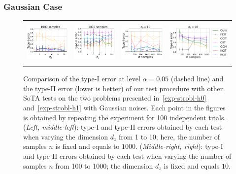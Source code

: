 \subsubsection{Gaussian Case}
\vspace{-0.4cm}

\begin{figure}[h]
\begin{tabular}{cccc} 
\includegraphics[height=2.2cm]{sections/appendix/independence_testing_kernel/figures_strobl_gaussian/nsamples_fixed_1000_strobl_dim_1_10_typeI.pdf}& \includegraphics[height=2.2cm]{sections/appendix/independence_testing_kernel/figures_strobl_gaussian/nsamples_fixed_1000_strobl_dim_1_10_typeII.pdf} & 
\includegraphics[height=2.2cm]{sections/appendix/independence_testing_kernel/figures_strobl_gaussian/dim_fixed_10_strobl_typeI.pdf}& \includegraphics[height=2.2cm]{sections/appendix/independence_testing_kernel/figures_strobl_gaussian/dim_fixed_10_strobl_typeII.pdf}
\end{tabular}
\caption{Comparison of the type-I error at level $\alpha=0.05$ (dashed line) and the type-II error (lower is better) of our test procedure with other SoTA tests on the two problems presented in~\eqref{exp-strobl-h0} and~\eqref{exp-strobl-h1}  with Gaussian noises. Each point in the figures is obtained by repeating the experiment for 100 independent trials. (\emph{Left, middle-left}): type-I and type-II errors obtained by each test when varying the dimension $d_z$ from 1 to 10; here, the number of samples $n$ is fixed and equals to $1000$. (\emph{Middle-right, right}): type-I and type-II errors obtained by each test when varying the number of samples $n$ from 100 to 1000; the dimension $d_z$ is fixed and equals $10$. 
}
\end{figure}
